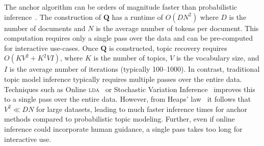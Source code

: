 The anchor algorithm can be orders of magnitude faster
than probabilistic inference~\cite{anchors-practical}.
The construction of $\bm{Q}$ has a runtime of $O(D N^2)$ where $D$ is the
number of documents and $N$ is the average number of tokens per document.
This computation requires only a single pass over the data and can
be pre-computed for interactive use-cases.
Once $\bm{Q}$ is constructed, topic recovery requires $O(K V^2 + K^2 V I)$,
where $K$ is the number of topics, $V$ is the vocabulary size, and $I$ is the
average number of iterations (typically 100--1000).
In contrast, traditional topic model inference typically
requires multiple passes over the entire data.
Techniques such as Online \textsc{lda}~\cite{online-lda} or Stochastic Variation
Inference~\cite{stochastic-variational} improves this to a single
pass over the entire data.
However, from Heaps' law~\cite{heaps-law} it follows that $V^2 \ll D N$ for large datasets,
leading to much faster inference times for anchor methods compared to
probabilistic topic modeling.
Further, even if online inference could incorporate human guidance, a
single pass takes too long for interactive use.

